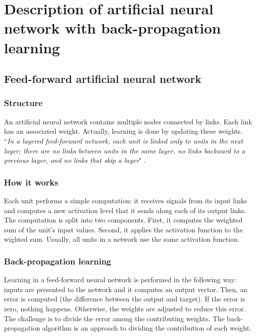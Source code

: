 \documentclass[12pt]{report}
\begin{document}
\section{Description of artificial neural network with back-propagation learning}
 \subsection{Feed-forward artificial neural network}
 \subsubsection{Structure}
 An artificial neural network contains multiple nodes connected by links. Each link has an associated weight. Actually, learning is done by updating these weights. “\textit{In a layered feed-forward network, each unit is linked only to units in the next layer; there are no links between units in the same layer, no links backward to a previous layer, and no links that skip a layer}"  \cite{artificialIntelligenceModernApproach}.
 
 \subsubsection{How it works}
 Each unit performs a simple computation: it receives signals from its input links and computes a new activation level that it sends along each of its output links. The computation is split into two components. First, it computes the weighted sum of the unit's input values. Second, it applies the activation function to the wighted sum.  Usually, all units in a network use the same activation function.
 
 \subsubsection{Back-propagation learning}
 Learning in a feed-forward neural network is performed in the following way: inputs are presented to the network and it computes an output vector. Then, an error is computed  (the difference between the output and target). If the error is zero, nothing happens. Otherwise, the weights are adjusted to  reduce this error. The challenge is to divide the error among the contributing weights. The back-propagation algorithm is an approach to dividing the contribution of each weight.

\printbibliography
\end{document}
